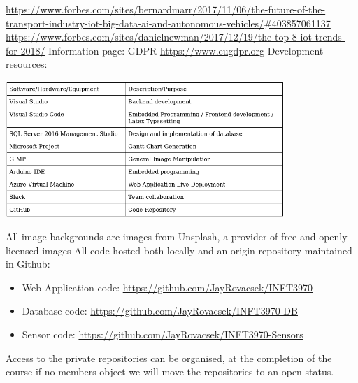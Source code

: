 \documentclass{article}
\begin{document}
\begin{thebibliography}{9}
        \newpage

            \url{https://www.forbes.com/sites/bernardmarr/2017/11/06/the-future-of-the-transport-industry-iot-big-data-ai-and-autonomous-vehicles/#403857061137}
            \url{https://www.forbes.com/sites/danielnewman/2017/12/19/the-top-8-iot-trends-for-2018/}
            Information page: GDPR
            \url{https://www.eugdpr.org}
            Development resources:
            \begin{center}
                \includegraphics[width=400px]{Images/DevelopmentResources.jpg}
            \end{center}
    \end{thebibliography}
    All image backgrounds are images from Unsplash, a provider of free and openly licensed images\cite{Unsplash}
    \vspace{5mm}
    All code hosted both locally and an origin repository maintained in Github:
    \begin{itemize}
        \item Web Application code: \url{https://github.com/JayRovacsek/INFT3970}
        \item Database code: \url{https://github.com/JayRovacsek/INFT3970-DB}
        \item Sensor code: \url{https://github.com/JayRovacsek/INFT3970-Sensors}
    \end{itemize}
    Access to the private repositories can be organised, at the completion of the course if no members
    object we will move the repositories to an open status.
\end{document}
